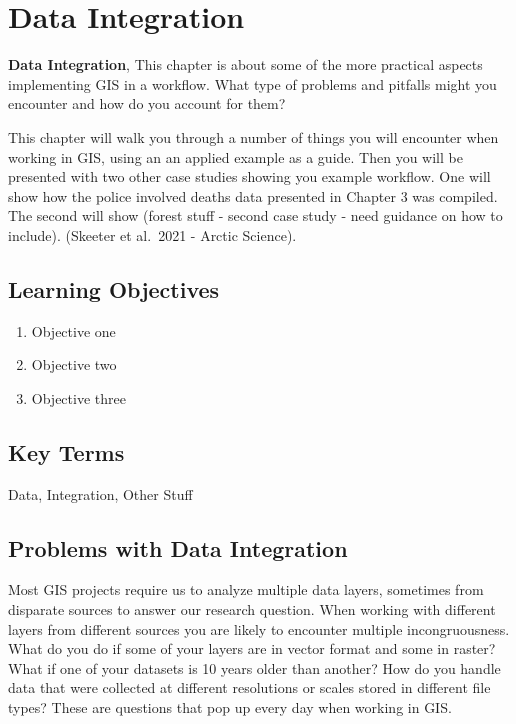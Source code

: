 \documentclass[
]{book}
\providecommand{\tightlist}{%
  \setlength{\itemsep}{0pt}\setlength{\parskip}{0pt}}
\begin{document}
\hypertarget{data-integration}{%
\chapter{Data Integration}\label{data-integration}}

\textbf{Data Integration}, This chapter is about some of the more practical aspects implementing GIS in a workflow. What type of problems and pitfalls might you encounter and how do you account for them?

This chapter will walk you through a number of things you will encounter when working in GIS, using an an applied example as a guide. Then you will be presented with two other case studies showing you example workflow. One will show how the police involved deaths data presented in Chapter 3 was compiled. The second will show (forest stuff - second case study - need guidance on how to include).
(Skeeter et al.~2021 - Arctic Science).

\hypertarget{learning-objectives-14}{%
\section*{Learning Objectives}\label{learning-objectives-14}}

\begin{enumerate}
\def\labelenumi{\arabic{enumi}.}
\tightlist
\item
  Objective one
\item
  Objective two
\item
  Objective three
\end{enumerate}

\hypertarget{key-terms-14}{%
\section*{Key Terms}\label{key-terms-14}}

Data, Integration, Other Stuff

\hypertarget{problems-with-data-integration}{%
\section{Problems with Data Integration}\label{problems-with-data-integration}}

Most GIS projects require us to analyze multiple data layers, sometimes from disparate sources to answer our research question. When working with different layers from different sources you are likely to encounter multiple incongruousness. What do you do if some of your layers are in vector format and some in raster? What if one of your datasets is 10 years older than another? How do you handle data that were collected at different resolutions or scales stored in different file types? These are questions that pop up every day when working in GIS.
\end{document}
